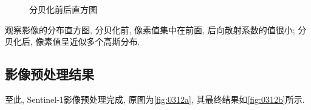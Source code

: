 \begin{figure}[htbp]
    \centering
    \qquad
    \caption{分贝化前后直方图}
    \label{fig:0311}
\end{figure}

观察影像的分布直方图, 分贝化前, 像素值集中在前面, 后向散射系数的值很小; 分贝化后, 像素值呈近似多个高斯分布. 

\newpage
\subsection{影像预处理结果}

至此, Sentinel-1影像预处理完成, 原图为\ref{fig:0312a}, 其最终结果如\ref{fig:0312b}所示.

